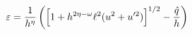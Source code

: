 \begin{equation}
\varepsilon = \frac{1}{h^\eta} \left( \Bigl[ 1 + h^{2\eta -
\omega} \ell^2 (u^2 + u'^2) \Bigr]^{1/2} - \frac{\hat{q}}{h}
\right) \label{E}
\end{equation}

